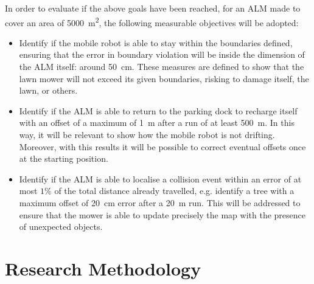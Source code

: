 In order to evaluate if the above goals have been reached, for an \gls{ALM} made to cover an area of \SI{5000}{\meter\squared}, the following measurable objectives will be adopted:
\begin{itemize}
    \item Identify if the mobile robot is able to stay within the boundaries defined, ensuring that the error in boundary violation will be inside the dimension of the \gls{ALM} itself: around \SI{50}{\cm}.
    These measures are defined to show that the lawn mower will not exceed its given boundaries, risking to damage itself, the lawn, or others.
    \item Identify if the \gls{ALM} is able to return to the parking dock to recharge itself with an offset of a maximum of \SI{1}{\m} after a run of at least \SI{500}{\m}. In this way, it will be relevant to show how the mobile robot is not drifting.
    Moreover, with this results it will be possible to correct eventual offsets once at the starting position.
    \item Identify if the \gls{ALM} is able to localise a collision event within an error of at most $1\%$ of the total distance already travelled, e.g. identify a tree with a maximum offset of \SI{20}{\cm} error after a \SI{20}{\m} run.
    This will be addressed to ensure that the mower is able to update precisely the map with the presence of unexpected objects.
\end{itemize}



\section{Research Methodology}

